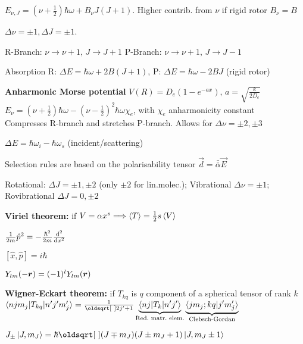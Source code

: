 \begin{squishlist}
    \item $E_{\nu, J} = (\nu + \frac{1}{2}) \hbar \omega + B_{\nu} J(J+1)$. Higher contrib. from $\nu$ \squishsep if rigid rotor $B_{\nu} = B$
    \item $\Delta \nu = \pm 1, \Delta J = \pm 1$.
    \item R-Branch: $\nu \rightarrow \nu + 1,\, J \rightarrow J+1$ \quad P-Branch:  $\nu \rightarrow \nu + 1, \,  J \rightarrow J-1$
    \item Absorption \quad R: $\Delta E = \hbar \omega + 2B(J+1)$, P: $\Delta E = \hbar \omega - 2BJ$ (rigid rotor)
    \item \textbf{Anharmonic Morse potential} $V(R) = D_e (1 - e^{-ax}), \, a = \sqrt{\frac{k}{2D_e}}$ \\
    $E_{\nu} = (\nu+\frac{1}{2}) \hbar \omega - (\nu - \frac{1}{2})^2 \hbar \omega \chi_e$, with $\chi_e$ anharmonicity constant \\
    Compresses R-branch and stretches P-branch. Allows for $\Delta \nu = \pm 2, \pm 3$
\end{squishlist}

\begin{squishlist}
    \item $\Delta E = \hbar \omega_i - \hbar \omega_s$ (incident/scattering)
    \item Selection rules are based on the polarisability tensor $\vec{d} = \bar{\bar{\alpha}} \vec{E}$
    \item Rotational: $\Delta J = \pm 1, \pm 2$ (only $\pm 2$ for lin.molec.); Vibrational $\Delta \nu  =\pm 1$; \\ Rovibrational $\Delta J = 0, \pm 2$
\end{squishlist}

\begin{squishlist}
    \item \textbf{Viriel theorem:} if $V = \alpha x^s \Longrightarrow \braket{T} = \frac{1}{2}s \braket{V}$
    \item $\frac{1}{2m}\hat{p}^2 = - \frac{\hbar^2}{2m} \frac{\textrm{d}^2 }{\textrm{d} x^2}$
    \item $[\hat{x}, \hat{p}] = i \hbar$
    \item $Y_{lm}(-\bm{r}) = (-1)^l Y_{lm}(\bm{r})$
    \item \textbf{Wigner-Eckart theorem:} if $T_{kq}$ is $q$ component of a spherical tensor of rank $k$ \\
    $\braket{n j m_j | T_{kq} | n' j' m_j'} = \frac{1}{\sqrt{2j'+1}} \underbrace{\braket{n j | T_k | n'j'}}_{\text{Red.\ matr.\ elem.}} \underbrace{\braket{j m_j ; k q | j' m_j'}}_{\text{Clebsch-Gordan}}$

    \item $J_{\pm} \ket{J,m_J} = \hbar \sqrt{(J \mp m_J)(J \pm m_J + 1)} \ket{J,m_J \pm 1 }$
\end{squishlist}